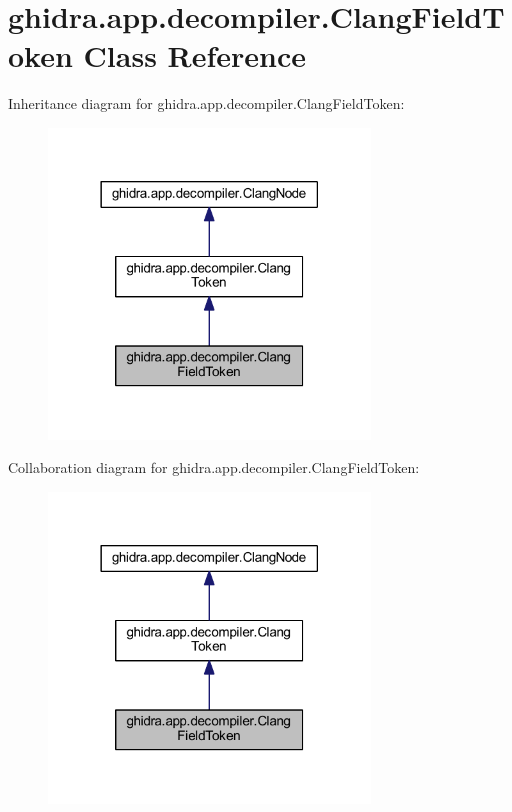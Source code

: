 \hypertarget{classghidra_1_1app_1_1decompiler_1_1_clang_field_token}{}\section{ghidra.\+app.\+decompiler.\+Clang\+Field\+Token Class Reference}
\label{classghidra_1_1app_1_1decompiler_1_1_clang_field_token}


Inheritance diagram for ghidra.\+app.\+decompiler.\+Clang\+Field\+Token\+:
\nopagebreak
\begin{figure}[H]
\begin{center}
\leavevmode
\includegraphics[width=242pt]{classghidra_1_1app_1_1decompiler_1_1_clang_field_token__inherit__graph}
\end{center}
\end{figure}


Collaboration diagram for ghidra.\+app.\+decompiler.\+Clang\+Field\+Token\+:
\nopagebreak
\begin{figure}[H]
\begin{center}
\leavevmode
\includegraphics[width=242pt]{classghidra_1_1app_1_1decompiler_1_1_clang_field_token__coll__graph}
\end{center}
\end{figure}

